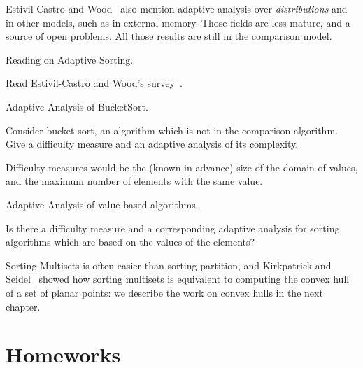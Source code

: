 Estivil-Castro and Wood~\cite{estivillcastro92survey} also mention
adaptive analysis over {\em distributions} and in other models, such
as in external memory. 
%
Those fields are less mature, and a source of
open problems. 
%
All those results are still in the comparison model.

\begin{homework}[e]
\caption{Reading on Adaptive Sorting.}
  Read Estivil-Castro and Wood's survey~\cite{estivillcastro92survey}.
\end{homework}

\begin{homework}[e]
\caption{Adaptive Analysis of BucketSort. \label{hmw:bucketSort}}
  Consider bucket-sort, an algorithm which is not in the comparison
  algorithm. Give a difficulty measure and an adaptive analysis of its
  complexity.
  \begin{solution}
    Difficulty measures would be the (known in advance) size of the
    domain of values, and the maximum number of elements with the same
    value.
  \end{solution}
\end{homework}

\begin{openproblem}
\caption{Adaptive Analysis of value-based algorithms.\label{opb:valueBasedSorting}}
  Is there a difficulty measure and a corresponding adaptive analysis
  for sorting algorithms which are based on the values of the
  elements?
\end{openproblem}

Sorting Multisets is often easier than sorting partition, and
Kirkpatrick and Seidel~\cite{kirkpatrick} showed how sorting multisets
is equivalent to computing the convex hull of a set of planar points:
we describe the work on convex hulls in the next chapter.



\section{Homeworks}
\label{sec:homeworks}





